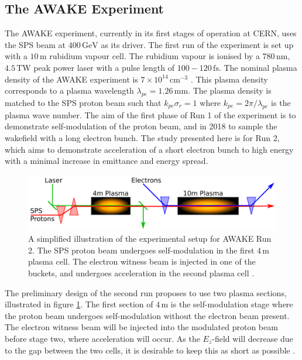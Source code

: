 \documentclass[aps,prstab,reprint,amsmath,amssymb,groupedaddress]{revtex4-1}
\newcommand{\unit}[1]{\,\mathrm{#1}}
\newcommand{\nexp}[1]{\times 10^{#1}}
\begin{document}
\subsection[\label{S:I:AWAKE}]{The AWAKE Experiment}

The AWAKE experiment, currently in its first stages of operation at CERN, uses the SPS beam at $400\unit{GeV}$ as its
driver. The first run of the experiment is set up with a $10\unit{m}$ rubidium vapour cell. The rubidium vapour is
ionised by a $780\unit{nm}$, $4.5\unit{TW}$ peak power laser with a pulse length of $100−120\unit{fs}$. The nominal
plasma density of the AWAKE experiment is $7\nexp{14}\unit{cm}^{-3}$ \cite{gschwendtner:2016}. This plasma density
corresponds to a plasma wavelength $\lambda_{pe} = 1.26\unit{mm}$. The plasma density is matched to the SPS proton beam
such that $k_{pe}\sigma_{r} = 1$ where $k_{pe} = 2\pi/\lambda_{pe}$ is the plasma wave number. The aim of the first
phase of Run 1 of the experiment is to demonstrate self-modulation of the proton beam, and in 2018 to sample the
wakefield with a long electron bunch. The study presented here is for Run 2, which aims to demonstrate acceleration of a
short electron bunch to high energy with a minimal increase in emittance and energy spread.

\begin{figure}[hbt]
    \includegraphics[width=0.99\linewidth,trim={1mm 2mm 1mm 2mm},clip]{figures/figAWAKE}
    \caption{\label{Fig:AWAKER2} A simplified illustration of the experimental setup for AWAKE Run 2. The SPS proton
        beam undergoes self-modulation in the first $4\unit{m}$ plasma cell. The electron witness beam is injected in
        one of the buckets, and undergoes acceleration in the second plasma cell \cite{berglyd_olsen:2015, adli:2016}.}
\end{figure}

The preliminary design of the second run proposes to use two plasma sections, illustrated in figure \ref{Fig:AWAKER2}.
The first section of $4\unit{m}$ is the self-modulation stage where the proton beam undergoes self-modulation without
the electron beam present. The electron witness beam will be injected into the modulated proton beam before stage two,
where acceleration will occur. As the $E_z$-field will decrease due to the gap between the two cells, it is desirable to
keep this as short as possible \cite{adli:2016}.
\end{document}
